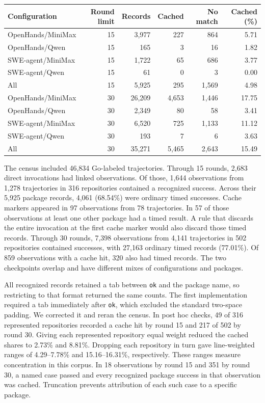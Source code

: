 \documentclass[10pt,a4paper]{article}
\begin{document}
\begin{center}\small
{}
\begin{tabular}{lrrrrr}
\toprule
Configuration & Round limit & Records & Cached & No match & Cached (\%)\\
\midrule
OpenHands/MiniMax & 15 & 3,977 & 227 & 864 & 5.71\\
OpenHands/Qwen & 15 & 165 & 3 & 16 & 1.82\\
SWE-agent/MiniMax & 15 & 1,722 & 65 & 686 & 3.77\\
SWE-agent/Qwen & 15 & 61 & 0 & 3 & 0.00\\
All & 15 & 5,925 & 295 & 1,569 & 4.98\\
\midrule
OpenHands/MiniMax & 30 & 26,209 & 4,653 & 1,446 & 17.75\\
OpenHands/Qwen & 30 & 2,349 & 80 & 58 & 3.41\\
SWE-agent/MiniMax & 30 & 6,520 & 725 & 1,133 & 11.12\\
SWE-agent/Qwen & 30 & 193 & 7 & 6 & 3.63\\
All & 30 & 35,271 & 5,465 & 2,643 & 15.49\\
\bottomrule
\end{tabular}
\end{center}

The census included 46,834 Go-labeled trajectories. Through 15 rounds, 2,683 direct invocations had linked observations. Of those, 1,644 observations from 1,278 trajectories in 316 repositories contained a recognized success. Across their 5,925 package records, 4,061 (68.54\%) were ordinary timed successes. Cache markers appeared in 97 observations from 78 trajectories. In 57 of those observations at least one other package had a timed result. A rule that discards the entire invocation at the first cache marker would also discard those timed records. Through 30 rounds, 7,398 observations from 4,141 trajectories in 502 repositories contained successes, with 27,163 ordinary timed records (77.01\%). Of 859 observations with a cache hit, 320 also had timed records. The two checkpoints overlap and have different mixes of configurations and packages.

All recognized records retained a tab between \texttt{ok} and the package name, so restricting to that format returned the same counts. The first implementation required a tab immediately after \texttt{ok}, which excluded the standard two-space padding. We corrected it and reran the census. In post hoc checks, 49 of 316 represented repositories recorded a cache hit by round 15 and 217 of 502 by round 30. Giving each represented repository equal weight reduced the cached shares to 2.73\% and 8.81\%. Dropping each repository in turn gave line-weighted ranges of 4.29--7.78\% and 15.16--16.31\%, respectively. These ranges measure concentration in this corpus. In 18 observations by round 15 and 351 by round 30, a named case passed and every recognized package success in that observation was cached. Truncation prevents attribution of each such case to a specific package.
\end{document}
